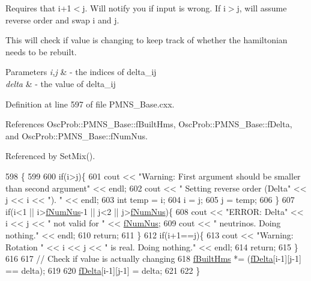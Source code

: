 Requires that i+1$<$j. Will notify you if input is wrong. If i$>$j, will assume reverse order and swap i and j.

This will check if value is changing to keep track of whether the hamiltonian needs to be rebuilt.


\begin{DoxyParams}{Parameters}
{\em i,j} & -\/ the indices of delta\+\_\+ij \\
\hline
{\em delta} & -\/ the value of delta\+\_\+ij \\
\hline
\end{DoxyParams}


Definition at line 597 of file P\+M\+N\+S\+\_\+\+Base.\+cxx.



References Osc\+Prob\+::\+P\+M\+N\+S\+\_\+\+Base\+::f\+Built\+Hms, Osc\+Prob\+::\+P\+M\+N\+S\+\_\+\+Base\+::f\+Delta, and Osc\+Prob\+::\+P\+M\+N\+S\+\_\+\+Base\+::f\+Num\+Nus.



Referenced by Set\+Mix().


\begin{DoxyCode}
598 \{
599 
600   \textcolor{keywordflow}{if}(i>j)\{
601     cout << \textcolor{stringliteral}{"Warning: First argument should be smaller than second argument"} << endl;
602     cout << \textcolor{stringliteral}{"         Setting reverse order (Delta"} << j << i << \textcolor{stringliteral}{"). "} << endl;
603     \textcolor{keywordtype}{int} temp = i;
604     i = j;
605     j = temp;
606   \}
607   \textcolor{keywordflow}{if}(i<1 || i>\hyperlink{classOscProb_1_1PMNS__Base_a24bb74bed63569dfe88b18fa6a08060e}{fNumNus}-1 || j<2 || j>\hyperlink{classOscProb_1_1PMNS__Base_a24bb74bed63569dfe88b18fa6a08060e}{fNumNus})\{
608     cout << \textcolor{stringliteral}{"ERROR: Delta"} << i << j << \textcolor{stringliteral}{" not valid for "} << \hyperlink{classOscProb_1_1PMNS__Base_a24bb74bed63569dfe88b18fa6a08060e}{fNumNus};
609     cout << \textcolor{stringliteral}{" neutrinos. Doing nothing."} << endl;
610     \textcolor{keywordflow}{return};
611   \}
612   \textcolor{keywordflow}{if}(i+1==j)\{
613     cout << \textcolor{stringliteral}{"Warning: Rotation "} << i << j << \textcolor{stringliteral}{" is real. Doing nothing."} << endl;
614     \textcolor{keywordflow}{return};
615   \}
616 
617   \textcolor{comment}{// Check if value is actually changing}
618   \hyperlink{classOscProb_1_1PMNS__Base_a9ac3cadeac8db1b90f3152f476244780}{fBuiltHms} *= (\hyperlink{classOscProb_1_1PMNS__Base_ab2a5fa40e689b221c8a7d2c17213810d}{fDelta}[i-1][j-1] == delta);
619 
620   \hyperlink{classOscProb_1_1PMNS__Base_ab2a5fa40e689b221c8a7d2c17213810d}{fDelta}[i-1][j-1] = delta;
621 
622 \}
\end{DoxyCode}
